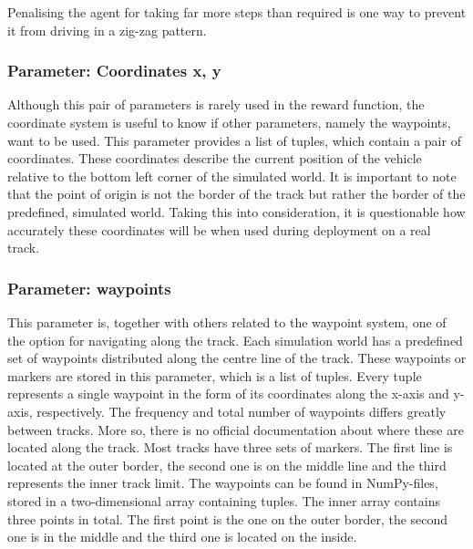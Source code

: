 Penalising the agent for taking far more steps than required is one way to prevent it from driving in a zig-zag pattern.

\subsubsection{Parameter: Coordinates x, y}
Although this pair of parameters is rarely used in the reward function, the coordinate system is useful to know if other parameters, namely the waypoints, want to be used. This parameter provides a list of tuples, which contain a pair of coordinates. These coordinates describe the current position of the vehicle relative to the bottom left corner of the simulated world. It is important to note that the point of origin is not the border of the track but rather the border of the predefined, simulated world. Taking this into consideration, it is questionable how accurately these coordinates will be when used during deployment on a real track.

\subsubsection{Parameter: waypoints}\label{sec:param_waypoints}
This parameter is, together with others related to the waypoint system, one of the option for navigating along the track. Each simulation world has a predefined set of waypoints distributed along the centre line of the track. These waypoints or markers are stored in this parameter, which is a list of tuples. Every tuple represents a single waypoint in the form of its coordinates along the x-axis and y-axis, respectively. The frequency and total number of waypoints differs greatly between tracks. More so, there is no official documentation about where these are located along the track. Most tracks have three sets of markers. The first line is located at the outer border, the second one is on the middle line and the third represents the inner track limit. The waypoints can be found in NumPy-files, stored in a two-dimensional array containing tuples. The inner array contains three points in total. The first point is the one on the outer border, the second one is in the middle and the third one is located on the inside.

